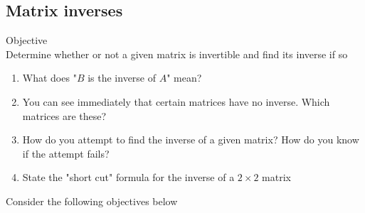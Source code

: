 \documentclass[journal, letterpaper]{IEEEtran}
\begin{document}
    \subsection{Matrix inverses}
    \begin{mybox}{Objective} \\ 
        Determine whether or not a given matrix is invertible and find its inverse if so
        \begin{enumerate}
            \item What does "$B$ is the inverse of $A$" mean?
            \item You can see immediately that certain matrices have no inverse. Which matrices are these?
            \item How do you attempt to find the inverse of a given matrix? How do you know if the attempt fails?
            \item State the "short cut" formula for the inverse of a $2 \times 2$ matrix
        \end{enumerate}
    \end{mybox}
    Consider the following objectives below
\end{document}
